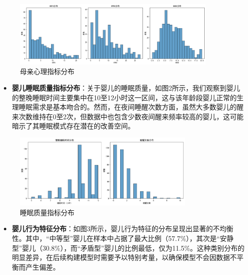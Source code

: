 \documentclass[withoutpreface,bwprint]{cumcmthesis}
\begin{document}
\begin{figure}[htbp]
    \centering
    \includegraphics[width=0.9\textwidth]{figures/psychological_indicators_distribution.png}
    \caption{母亲心理指标分布}
    \label{fig:psychological_indicators_distribution}
\end{figure}

\begin{itemize}
    \item \textbf{婴儿睡眠质量指标分布}：关于婴儿的睡眠质量，如图2所示，我们观察到婴儿的整晚睡眠时间主要集中在10至12小时这一区间，这与该年龄段婴儿正常的生理睡眠需求是基本吻合的。然而，在夜间睡醒次数方面，虽然大多数婴儿的醒来次数维持在0至2次，但数据中也包含少数夜间醒来频率较高的婴儿，这可能暗示了其睡眠模式存在潜在的改善空间。
\end{itemize}

\begin{figure}[htbp]
    \centering
    \includegraphics[width=0.8\textwidth]{figures/sleep_quality_distribution.png}
    \caption{睡眠质量指标分布}
    \label{fig:sleep_quality_distribution}
\end{figure}

\begin{itemize}
    \item \textbf{婴儿行为特征分布}：如图3所示，婴儿行为特征的分布呈现出显著的不均衡性。其中，“中等型”婴儿在样本中占据了最大比例（57.7\%），其次是“安静型”婴儿（30.8\%），而“矛盾型”婴儿的比例最低，仅为11.5\%。这种类别分布的明显差异，在后续构建模型时需要予以特别考量，以确保模型不会因数据不平衡而产生偏差。
\end{itemize}
\end{document}
